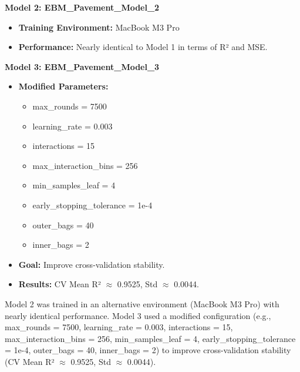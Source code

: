 \documentclass{article}
\begin{document}
\textbf{Model 2: EBM\_Pavement\_Model\_2}
\begin{itemize}
    \item \textbf{Training Environment:} MacBook M3 Pro
    \item \textbf{Performance:} Nearly identical to Model 1 in terms of R² and MSE.
\end{itemize}

\textbf{Model 3: EBM\_Pavement\_Model\_3}
\begin{itemize}
    \item \textbf{Modified Parameters:}
    \begin{itemize}
        \item max\_rounds = 7500
        \item learning\_rate = 0.003
        \item interactions = 15
        \item max\_interaction\_bins = 256
        \item min\_samples\_leaf = 4
        \item early\_stopping\_tolerance = 1e-4
        \item outer\_bags = 40
        \item inner\_bags = 2
    \end{itemize}
    \item \textbf{Goal:} Improve cross-validation stability.
    \item \textbf{Results:} CV Mean R² $\approx$ 0.9525, Std $\approx$ 0.0044.
\end{itemize}


Model 2 was trained in an alternative environment (MacBook M3 Pro) with nearly identical performance. Model 3 used a modified configuration (e.g., max\_rounds = 7500, learning\_rate = 0.003, interactions = 15, max\_interaction\_bins = 256, min\_samples\_leaf = 4, early\_stopping\_tolerance = 1e-4, outer\_bags = 40, inner\_bags = 2) to improve cross-validation stability (CV Mean R² $\approx$ 0.9525, Std $\approx$ 0.0044).
\end{document}
